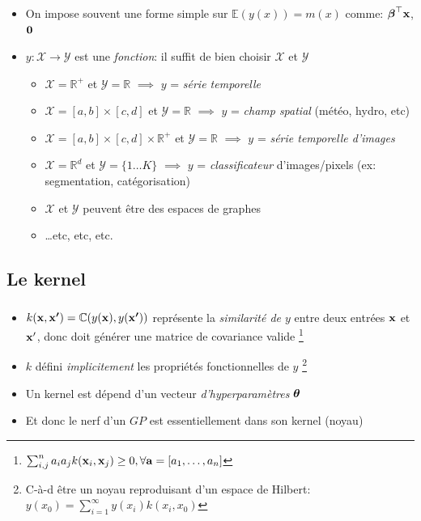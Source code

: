 \documentclass[xcolor=svgnames, t]{beamer}
\newcommand{\coloredemph}[1]{\textcolor{internationalblue}{\emph{#1}}}
\newcommand{\vectorx}[1]{\boldsymbol{\MakeLowercase{\mathbf{#1}}}}
\begin{document}
\begin{frame}
  \frametitle{\secname}
  \begin{itemize}
    \item On impose souvent une forme simple sur $\mathbb{E}(y(x)) = m(x)$ 
    comme: $\vectorx{\beta}^\top \vectorx{x}$, $\vectorx{0}$
    \pause
    \item $y: \mathcal{X} \to \mathcal{Y}$ est une \coloredemph{fonction}: il suffit de bien choisir $\mathcal{X}$ et $\mathcal{Y}$
    \begin{itemize}
      \item $\mathcal{X} = \mathbb{R}^{+}$ et $\mathcal{Y} = \mathbb{R}$ $\implies$
      $y$ = \coloredemph{série temporelle}
      \pause
      \item $\mathcal{X} = [a, b] \times [c, d]$ et  $\mathcal{Y} = \mathbb{R}$ $\implies$
      $y$ = \coloredemph{champ spatial} (météo, hydro, etc)
      \pause
      \item $\mathcal{X} = [a, b] \times [c, d] \times \mathbb{R}^{+}$ et $\mathcal{Y} = \mathbb{R}$ $\implies$
      $y$ = \coloredemph{série temporelle d'images}
      \pause
      \item $\mathcal{X} = \mathbb{R}^{d}$ et $\mathcal{Y} = \{1 \dots K \}$ $\implies$
      $y$ = \coloredemph{classificateur} d'images/pixels (ex: segmentation, catégorisation)
      \item $\mathcal{X}$ et $\mathcal{Y}$ peuvent être des espaces de graphes
      \item \dots etc, etc, etc.
    \end{itemize}
  \end{itemize}
\end{frame}

\subsection{Le kernel}
\begin{frame}
  \frametitle{\secname}
  \begin{itemize}
    \item $k(\vectorx{x}, \vectorx{x^{\prime}}) = \mathbb{C}( y(\vectorx{x}), y(\vectorx{x^\prime}) )$
     représente la \coloredemph{similarité de $y$} entre deux entrées $\vectorx{x}$ et $\vectorx{x}^\prime$,
     donc doit générer une matrice de covariance valide
     \footnote{
      $\sum_{i,j}^{n} a_i a_j k(\vectorx{x}_i, \vectorx{x}_j) \geq 0, \forall \vectorx{a} = [a_1, \dots, a_n]$
    }
    \pause
    \item $k$ défini \coloredemph{implicitement} les propriétés fonctionnelles de $y$
    \footnote{
      C-à-d être un noyau reproduisant d'un espace de Hilbert:
      $y(x_0) = \sum_{i=1}^{\infty} y(x_i) k(x_i, x_0)$ 
    }
    \pause
    \item Un kernel est dépend d'un vecteur \coloredemph{d'hyperparamètres} $\vectorx{\theta}$
    \pause
    \item Et donc le nerf d'un $GP$ est essentiellement dans son kernel (noyau)
  \end{itemize}
\end{frame}
\end{document}
